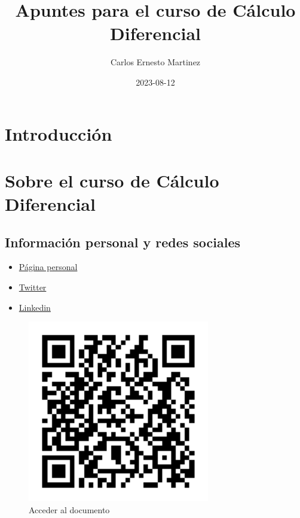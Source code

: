 \documentclass[]{book}
\title{Apuntes para el curso de Cálculo Diferencial}
\author{Carlos Ernesto Martinez}
\date{2023-08-12}
\providecommand{\tightlist}{%
  \setlength{\itemsep}{0pt}\setlength{\parskip}{0pt}}
\begin{document}
\maketitle

{
\setcounter{tocdepth}{1}
\tableofcontents
}
\justify

\newpage

\thispagestyle{empty}

\section*{Introducción}

\newpage

\thispagestyle{empty}

\section*{Sobre el curso de Cálculo Diferencial}

\subsection*{Información personal y redes sociales}

\begin{itemize}
\tightlist
\item
  \href{https://directorioprofesores.uacm.edu.mx/profesor.html?key=2003080144}{Página
  personal}
\item
  \href{https://twitter.com/carlosmroder}{Twitter}
\item
  \href{https://www.linkedin.com/in/carlos-martinez-r/}{Linkedin}
\end{itemize}

\begin{figure}
\centering
\includegraphics[width=3.12500in]{codigo_qr.png}
\caption{Acceder al documento}
\end{figure}
\end{document}
